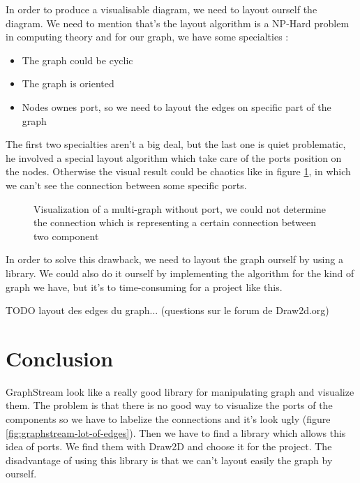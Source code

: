 In order to produce a visualisable diagram, we need to layout ourself the
diagram. We need to mention that's the layout algorithm is a NP-Hard problem in
computing theory\cite{Tamassia:2007:HGD:1202383} and for our graph, we have some
specialties :

\begin{itemize}
\item The graph could be cyclic
\item The graph is oriented
\item Nodes ownes port, so we need to layout the edges on specific part of the graph
\end{itemize}

The first two specialties aren't a big deal, but the last one is quiet
problematic, he involved a special layout algorithm which take care of the ports
position on the nodes. Otherwise the visual result could be chaotics like in
figure \ref{fig:multigraph-no-port}, in which we can't see the connection
between some specific ports.

\begin{figure}[h]
  \centering
  \caption[Visualization of a multi-graph without port]{Visualization of a
    multi-graph without port, we could not determine the connection which is
    representing a certain connection between two component}
  \label{fig:multigraph-no-port}
\end{figure}

In order to solve this drawback, we need to layout the graph ourself by using a
library. We could also do it ourself by implementing the algorithm for the kind
of graph we have, but it's to time-consuming for a project like this.

TODO layout des edges du graph... (questions sur le forum de Draw2d.org)

\section{Conclusion}
\label{sec:viewing-library-conclusion}

GraphStream look like a really good library for manipulating graph and visualize
them. The problem is that there is no good way to visualize the ports of the
components so we have to labelize the connections and it's look ugly (figure
\ref{fig:graphstream-lot-of-edges}). Then we have to find a library which allows
this idea of ports. We find them with Draw2D and choose it for the project. The
disadvantage of using this library is that we can't layout easily the graph by
ourself.


